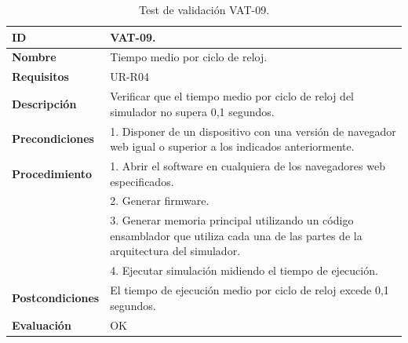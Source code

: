 \begin{center}
\begin{table}[htb]
\centering
\begin{tabular}{@{}p{2.5cm} p{9cm}@{}} 
\toprule
\textbf{ID} 					& VAT-09. \\
\midrule
\textbf{Nombre} 				& Tiempo medio por ciclo de reloj. \\
\midrule
\textbf{Requisitos} 		& UR-R04\\
\midrule
\textbf{Descripción} 		& Verificar que el tiempo medio por ciclo de reloj del simulador no supera 0,1 segundos. \\
\midrule
\textbf{Precondiciones}		& 1. Disponer de un dispositivo con una versión de navegador web igual o superior a los indicados anteriormente. \\
\midrule
\textbf{Procedimiento}			& 1. Abrir el software en cualquiera de los navegadores web especificados. \\
							& 2. Generar firmware.\\
							& 3. Generar memoria principal utilizando un código ensamblador que utiliza cada una de las partes de la arquitectura del simulador.\\
							& 4. Ejecutar simulación midiendo el tiempo de ejecución.\\
\midrule
\textbf{Postcondiciones} 		&  El tiempo de ejecución medio por ciclo de reloj excede 0,1 segundos.\\
\midrule
\textbf{Evaluación} 			& OK \\
\bottomrule
\end{tabular}
\caption{Test de validación VAT-09.}
\label{tab:vat-09}
\end{table}
\end{center}

